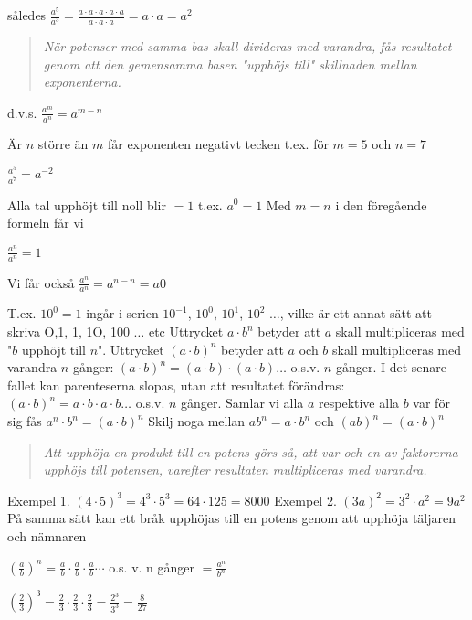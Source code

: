 således \(\frac{a^5}{a^3}=\frac{a \cdot a \cdot a \cdot a \cdot a}{a \cdot a \cdot a} = a \cdot a = a^2\)

\begin{quote}\emph{När potenser med samma bas skall divideras med varandra, fås
resultatet genom att den gemensamma basen "upphöjs till" skillnaden mellan
exponenterna.}\end{quote}

d.v.s. \(\frac{a^m}{a^n} = a^{m-n}\)

Är \(n\) större än \(m\) får exponenten negativt tecken t.ex. för \(m = 5\) och \(n = 7\)

\(\frac{a^5}{a^7} = a^{-2}\)

Alla tal upphöjt till noll blir \(= 1\) t.ex. \(a^0 = 1\)
Med \(m = n\) i den föregående formeln får vi

\(\frac{a^n}{a^n} = 1\)

Vi får också \(\frac{a^n}{a^n} = a^{n-n} =a0\)

T.ex. \(10^0 = 1\) ingår i serien \(10^{-1}\), \(10^0\), \(10^1\), \(10^2\) \(\ldots\), vilke
är ett annat sätt att skriva O,1, 1, 1O, 100 \(\ldots\) etc
Uttrycket \(a \cdot b^n\) betyder att \(a\) skall multipliceras med "\(b\) upphöjt
till \(n\)".
Uttrycket \((a \cdot b)^n\) betyder att \(a\) och \(b\) skall multipliceras med
varandra \(n\) gånger:
\((a \cdot b)^n = (a \cdot b) \cdot (a \cdot b) \ldots \) o.s.v. \(n\) gånger.
I det senare fallet kan parenteserna slopas, utan att resultatet förändras:
\((a \cdot b)^n = a \cdot b \cdot a \cdot b \ldots\) o.s.v. \(n\) gånger.
Samlar vi alla \(a\) respektive alla \(b\) var för sig fås \(a^n \cdot b^n = (a \cdot b)^n\)
Skilj noga mellan \(ab^n = a \cdot b^n\)
och \((ab)^n = (a \cdot b)^n\)

\begin{quote}\emph{
Att upphöja en produkt till en potens görs så, att var och en av faktorerna
upphöjs till potensen, varefter resultaten multipliceras med varandra.
}\end{quote}

Exempel 1. \((4 \cdot 5)^3 = 4^3 \cdot 5^3 = 64 \cdot 125 = 8000\)
Exempel 2. \((3a)^2 = 3^2 \cdot a^2 = 9a^2\)
På samma sätt kan ett bråk upphöjas till en potens genom att upphöja täljaren
och nämnaren

\(\left(\frac{a}{b}\right)^n = \frac{a}{b} \cdot \frac{a}{b} \cdot \frac{a}{b} \cdots\) o.s. v. n gånger \(= \frac{a^n}{b^n}\)

\(\left(\frac{2}{3}\right)^3 = \frac{2}{3} \cdot \frac{2}{3} \cdot \frac{2}{3} =  \frac{2^3}{3^3} = \frac{8}{27}\)

